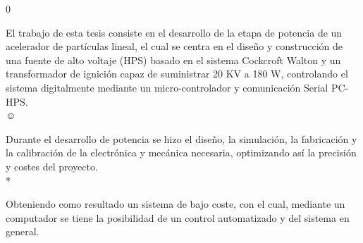 0


\begin{abstracts}        %
El trabajo de esta tesis consiste en el desarrollo de la etapa de potencia de un acelerador de partículas lineal, el cual se centra en el diseño y construcción de una fuente de alto voltaje (HPS) basado en el sistema Cockcroft Walton  y un transformador de ignición capaz de suministrar 20 KV a 180 W, controlando el sistema digitalmente mediante un micro-controlador y comunicación Serial PC-HPS.\\☺

Durante el desarrollo de potencia se hizo el diseño, la simulación, la fabricación y la calibración de la electrónica y mecánica necesaria, optimizando así la precisión y costes del proyecto.\\*

Obteniendo como resultado un sistema de bajo coste, con el cual, mediante un computador se tiene la posibilidad de un control automatizado y  del sistema en general. 


\end{abstracts}


